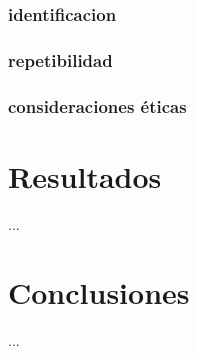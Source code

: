 \documentclass[12pt,letterpaper,oneside,openright]{book}
\begin{document}
\subsection{identificacion}
\subsection{repetibilidad}
\subsection{consideraciones éticas}

\chapter{Resultados}

...

\chapter{Conclusiones}

...


 
\end{document}
